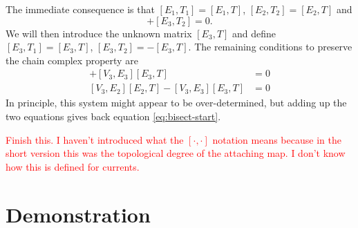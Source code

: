 \documentclass[twocolumn]{article}
\begin{document}
The immediate consequence is that $[E_1, T_1] = [E_1, T]$, $[E_2, T_2] = [E_2, T]$ and
\begin{equation}
    [E_3, T_1] + [E_3, T_2] = 0.
\end{equation}
We will then introduce the unknown matrix $[E_3, T]$ and define $[E_3, T_1] = [E_3, T]$, $[E_3, T_2] = -[E_3, T]$.
The remaining conditions to preserve the chain complex property are
\begin{align}
    [V_3, E_1][E_1, T] + [V_3, E_3][E_3, T] & = 0 \\
    [V_3, E_2][E_2, T] - [V_3, E_3][E_3, T] & = 0
\end{align}
In principle, this system might appear to be over-determined, but adding up the two equations gives back equation \eqref{eq:bisect-start}.

\textcolor{red}{Finish this.
I haven't introduced what the $[\cdot,\cdot]$ notation means because in the short version this was the topological degree of the attaching map.
I don't know how this is defined for currents.}


\section{Demonstration}
\end{document}
